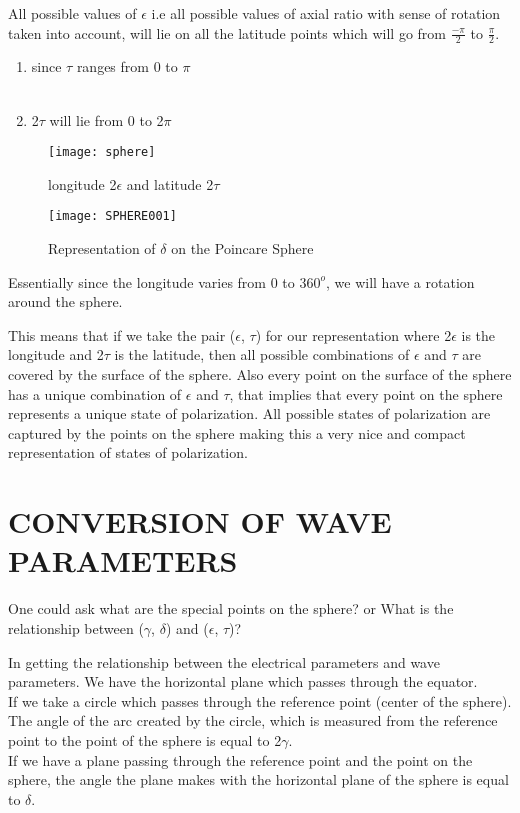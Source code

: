 	All possible values of $\epsilon$ i.e all possible values of axial ratio with sense of rotation taken into account, will lie on all the latitude points which will go from $\frac{-\pi}{2}$ to $\frac{\pi}{2}$. 
	\begin{enumerate}
	\item 	since $\tau$ ranges from 0 to $\pi$\\
		\\
		
	\item 	2$\tau$ will lie from 0 to 2$\pi$
	\end{enumerate}
	
	\begin{figure}[h]
		\centering
		\texttt{[image: sphere]}
		\caption{longitude 2$\epsilon$ and latitude 2$\tau$}
	\end{figure}
	\begin{figure}
		\centering
		\texttt{[image: SPHERE001]}
		\caption{Representation of $\delta$ on the Poincare Sphere}
		\label{fig:sphere001}
	\end{figure}
	Essentially since the longitude varies from 0 to $360^{o}$, we will have a rotation around the sphere.
	
	This means that if we take the pair ($\epsilon$, $\tau$) for our representation where  2$\epsilon$ is the longitude and 2$\tau$ is the latitude, then all possible combinations of $\epsilon$ and $\tau$ are covered by the surface of the sphere.	Also every point on the surface of the sphere has a unique combination of $\epsilon$ and $\tau$, that implies that every point on the sphere represents a unique state of polarization. All possible states of polarization are captured by the points on the sphere making this a very nice and compact representation of states of polarization.
	
	
	\section{CONVERSION OF WAVE PARAMETERS}
	
	One could ask what are the special points on the sphere? or What is the relationship between ($\gamma$, $\delta$) and ($\epsilon$, $\tau$)?  
	
	In getting the relationship between the electrical parameters and wave parameters. We have the horizontal plane which passes through the equator.\\
	If we take a circle which passes through the reference point (center of the sphere). The angle of the arc created by the circle, which is measured from the reference point to the point of the sphere is equal to 2$\gamma$.\\
	If we have a plane passing through the reference point and the point on the sphere, the angle the plane makes with the horizontal plane of the sphere is equal to $\delta$.\\

